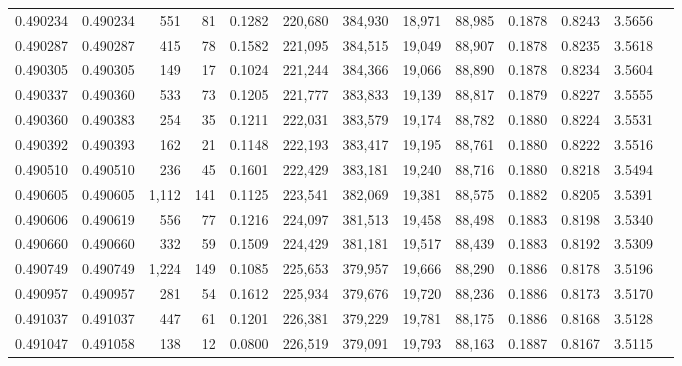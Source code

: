 \begin{tabular}{rrrrrrrrrrrrr}
0.490234 & 0.490234 &   551 &    81 &                                     0.1282 & 220,680 & 384,930 &  18,971 &  88,985 & 0.1878 & 0.8243 & 3.5656 \\
0.490287 & 0.490287 &   415 &    78 &                                     0.1582 & 221,095 & 384,515 &  19,049 &  88,907 & 0.1878 & 0.8235 & 3.5618 \\
0.490305 & 0.490305 &   149 &    17 &                                     0.1024 & 221,244 & 384,366 &  19,066 &  88,890 & 0.1878 & 0.8234 & 3.5604 \\
0.490337 & 0.490360 &   533 &    73 &                                     0.1205 & 221,777 & 383,833 &  19,139 &  88,817 & 0.1879 & 0.8227 & 3.5555 \\
0.490360 & 0.490383 &   254 &    35 &                                     0.1211 & 222,031 & 383,579 &  19,174 &  88,782 & 0.1880 & 0.8224 & 3.5531 \\
0.490392 & 0.490393 &   162 &    21 &                                     0.1148 & 222,193 & 383,417 &  19,195 &  88,761 & 0.1880 & 0.8222 & 3.5516 \\
0.490510 & 0.490510 &   236 &    45 &                                     0.1601 & 222,429 & 383,181 &  19,240 &  88,716 & 0.1880 & 0.8218 & 3.5494 \\
0.490605 & 0.490605 & 1,112 &   141 &                                     0.1125 & 223,541 & 382,069 &  19,381 &  88,575 & 0.1882 & 0.8205 & 3.5391 \\
0.490606 & 0.490619 &   556 &    77 &                                     0.1216 & 224,097 & 381,513 &  19,458 &  88,498 & 0.1883 & 0.8198 & 3.5340 \\
0.490660 & 0.490660 &   332 &    59 &                                     0.1509 & 224,429 & 381,181 &  19,517 &  88,439 & 0.1883 & 0.8192 & 3.5309 \\
0.490749 & 0.490749 & 1,224 &   149 &                                     0.1085 & 225,653 & 379,957 &  19,666 &  88,290 & 0.1886 & 0.8178 & 3.5196 \\
0.490957 & 0.490957 &   281 &    54 &                                     0.1612 & 225,934 & 379,676 &  19,720 &  88,236 & 0.1886 & 0.8173 & 3.5170 \\
0.491037 & 0.491037 &   447 &    61 &                                     0.1201 & 226,381 & 379,229 &  19,781 &  88,175 & 0.1886 & 0.8168 & 3.5128 \\
0.491047 & 0.491058 &   138 &    12 &                                     0.0800 & 226,519 & 379,091 &  19,793 &  88,163 & 0.1887 & 0.8167 & 3.5115 \\

\end{tabular}
